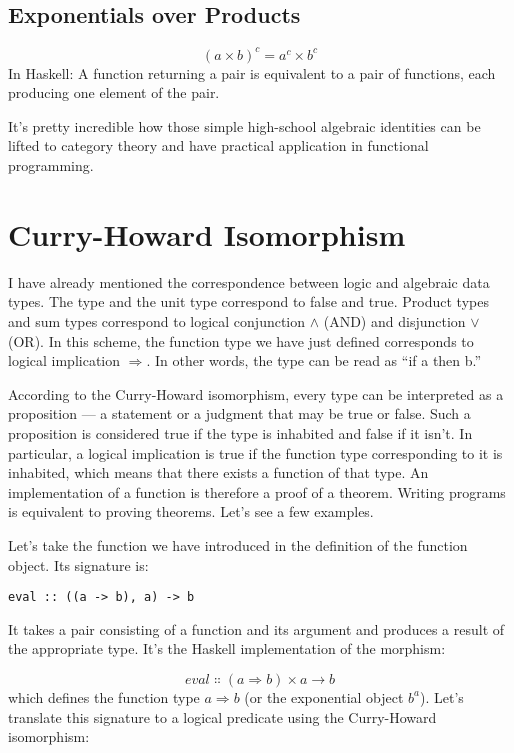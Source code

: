 \subsection{Exponentials over Products}

\[(a \times b)^{c} = a^{c} \times b^{c}\]
In Haskell: A function returning a pair is equivalent to a pair of
functions, each producing one element of the pair.

It's pretty incredible how those simple high-school algebraic identities
can be lifted to category theory and have practical application in
functional programming.

\section{Curry-Howard Isomorphism}

I have already mentioned the correspondence between logic and algebraic
data types. The  type and the unit type \code{()}
correspond to false and true. Product types and sum types correspond to
logical conjunction $\wedge$ (AND) and disjunction $\vee$ (OR). In this scheme, the
function type we have just defined corresponds to logical implication $\Rightarrow$.
In other words, the type  can be read as ``if
a then b.''

According to the Curry-Howard isomorphism, every type can be interpreted
as a proposition --- a statement or a judgment that may be true or
false. Such a proposition is considered true if the type is inhabited
and false if it isn't. In particular, a logical implication is true if
the function type corresponding to it is inhabited, which means that
there exists a function of that type. An implementation of a function is
therefore a proof of a theorem. Writing programs is equivalent to
proving theorems. Let's see a few examples.

Let's take the function  we have introduced in the
definition of the function object. Its signature is:

\begin{Verbatim}
eval :: ((a -> b), a) -> b
\end{Verbatim}
It takes a pair consisting of a function and its argument and produces a
result of the appropriate type. It's the Haskell implementation of the
morphism:

\[eval \Colon (a \Rightarrow b) \times a \to b\]
which defines the function type $a \Rightarrow b$ (or the exponential object
$b^{a}$). Let's translate this signature to a logical predicate
using the Curry-Howard isomorphism:

